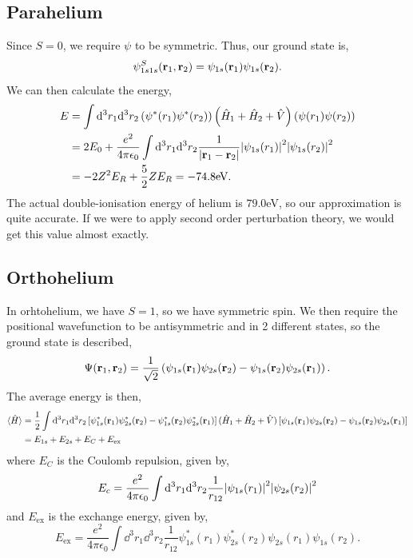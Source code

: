 \documentclass{book}
\begin{document}
\subsection{Parahelium}
Since $S = 0$, we require $\psi$ to be symmetric. Thus, our ground state is,
\begin{equation}
	\psi^S_{1s1s}(\vb{r}_1,\vb{r}_2) = \psi_{1s}(\vb{r}_1)\psi_{1s}(\vb{r}_2).
\end{equation}
We can then calculate the energy,
\begin{equation}
	\begin{split}
		E &= \int \dd^3r_1\dd^3r_2\left(\psi^*(r_1)\psi^*(r_2)\right)\left(\hat{H}_1 + \hat{H}_2 + \hat{V}\right)\left(\psi(r_1)\psi(r_2)\right) \\
		& = 2E_0 + \frac{e^2}{4\pi\epsilon_0}\int\dd^3r_1\dd^3r_2\frac{1}{\abs{\vb{r}_1 - \vb{r}_2}}\abs{\psi_{1s}(r_1)}^2\abs{\psi_{1s}(r_2)}^2 \\
		& = -2Z^2E_R + \frac{5}{2}ZE_R = -74.8\text{eV}.
	\end{split}
\end{equation}
The actual double-ionisation energy of helium is $79.0$eV, so our approximation is quite accurate. If we were to apply second order perturbation theory, we would get this value almost exactly. 
\subsection{Orthohelium}
In orhtohelium, we have $S = 1$, so we have symmetric spin. We then require the positional wavefunction to be antisymmetric and in 2 different states, so the ground state is described,
\begin{equation}
	\Psi(\vb{r}_1,\vb{r}_2) = \frac{1}{\sqrt{2}}\left(\psi_{1s}(\vb{r}_1)\psi_{2s}(\vb{r}_2) - \psi_{1s}(\vb{r}_2) \psi_{2s}(\vb{r}_1)\right). \label{eq:PSI}
\end{equation}
The average energy is then,
\begin{equation}
	\begin{split}
	\langle \hat{H} \rangle & = \frac{1}{2}\int \dd^{3}r_1 \dd^3r_2\left[ \psi_{1s}^*(\vb{r}_1)\psi_{2s}^*(\vb{r}_2) - \psi^*_{1s}(\vb{r}_2) \psi^*_{2s}(\vb{r}_1)\right](\hat{H}_1 + \hat{H}_2 + \hat{V})\left[\psi_{1s}(\vb{r}_1)\psi_{2s}(\vb{r}_2) - \psi_{1s}(\vb{r}_2) \psi_{2s}(\vb{r}_1)\right] \\
	 & = E_{1s} + E_{2s} + E_C + E_{\text{ex}}
	\end{split}
\end{equation}
where $E_C$ is the Coulomb repulsion, given by,
\begin{equation}
	E_c = \frac{e^2}{4\pi \epsilon_0}\int \dd^3r_1\dd^3r_2 \frac{1}{r_{12}}\abs{\psi_{1s}(r_1)}^2\abs{\psi_{2s}(r_2)}^2
\end{equation}
and $E_{\text{ex}}$ is the exchange energy, given by,
\begin{equation}
	E_{\text{ex}} = \frac{e^2}{4\pi \epsilon_0}\int \dd^3r_1\dd^3r_2 \frac{1}{r_{12}}\psi_{1s}^*(r_1)\psi_{2s}^*(r_2)\psi_{2s}(r_1)\psi_{1s}(r_2).
\end{equation}
\end{document}
